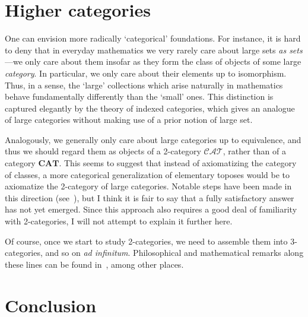 \documentclass{amsart}
\begin{document}
\section{Higher categories}
\label{sec:higher-cats}

One can envision more radically `categorical' foundations.  For
instance, it is hard to deny that in everyday mathematics we very
rarely care about large sets \emph{as sets}---we only care about them
insofar as they form the class of objects of some large
\emph{category}.  In particular, we only care about their elements up
to isomorphism.  Thus, in a sense, the `large' collections which arise
naturally in mathematics behave fundamentally differently than the
`small' ones.  This distinction is captured elegantly by the theory of
indexed categories, which gives an analogue of large categories
without making use of a prior notion of large set.

Analogously, we generally only care about large categories up to
equivalence, and thus we should regard them as objects of a 2-category
$\mathcal{CAT}$, rather than of a category $\mathbf{CAT}$.  This seems
to suggest that instead of axiomatizing the category of classes, a
more categorical generalization of elementary toposes would be to
axiomatize the 2-category of large categories.  Notable steps have
been made in this direction
(see~\cite{street:elem-cosmoi-i,weber:2toposes}), but I think it is
fair to say that a fully satisfactory answer has not yet emerged.
Since this approach also requires a good deal of familiarity with
2-categories, I will not attempt to explain it further here.

Of course, once we start to study 2-categories, we need to assemble
them into 3-categories, and so on \emph{ad infinitum}.  Philosophical
and mathematical remarks along these lines can be found
in~\cite{mak:catfdn}, among other places.



\section{Conclusion}
\label{sec:conclusion}
\end{document}
